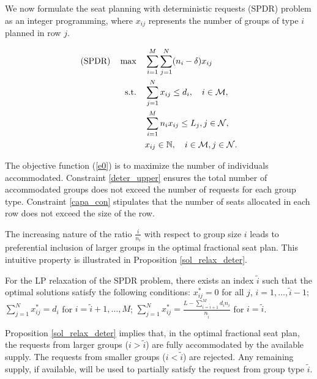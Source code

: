 We now formulate the seat planning with deterministic requests (SPDR) problem as an integer programming, where $x_{ij}$ represents the number of groups of type $i$ planned in row $j$. 

\begin{align}
(\text{SPDR}) \quad \max \quad & \sum_{i=1}^{M}  \sum_{j= 1}^{N} (n_i - \delta) x_{ij} \label{e0} \\
\text {s.t.} \quad & \sum_{j= 1}^{N} x_{ij} \leq d_{i}, \quad i \in \mathcal{M}, \label{deter_upper}\\ 
& \sum_{i=1}^{M} n_{i} x_{ij} \leq L_j, j \in \mathcal{N}, \label{capa_con} \\
& x_{ij} \in \mathbb{N}, \quad i \in \mathcal{M}, j \in \mathcal{N}. \notag 
\end{align}


The objective function (\ref{e0}) is to maximize the number of individuals accommodated. Constraint \eqref{deter_upper} ensures the total number of accommodated groups does not exceed the number of requests for each group type. Constraint \eqref{capa_con} stipulates that the number of seats allocated in each row does not exceed the size of the row.

The increasing nature of the ratio $\frac{i}{n_i}$ with respect to group size $i$ leads to preferential inclusion of larger groups in the optimal fractional seat plan. This intuitive property is illustrated in Proposition \ref{sol_relax_deter}.




\begin{prop}\label{sol_relax_deter}
For the LP relaxation of the \textup{SPDR} problem, there exists an index $\tilde{i}$ such that the optimal solutions satisfy the following conditions: $x_{ij}^{*} = 0$ for all $j$, $i = 1,\ldots, \tilde{i}-1$; $\sum_{j=1}^{N} x_{ij}^{*} = d_{i}$ for $i = \tilde{i}+1,\ldots, M$; $\sum_{j=1}^{N} x_{ij}^{*} = \frac{L - \sum_{i = \tilde{i}+1}^{M} {d_i n_i}}{n_{\tilde{i}}}$ for $i = \tilde{i}$.
\end{prop}

Proposition \ref{sol_relax_deter} implies that, in the optimal fractional seat plan, the requests from larger groups ($i > \tilde{i}$) are fully accommodated by the available supply. The requests from smaller groups ($i < \tilde{i}$) are rejected. Any remaining supply, if available, will be used to partially satisfy the request from group type $\tilde{i}$. 

